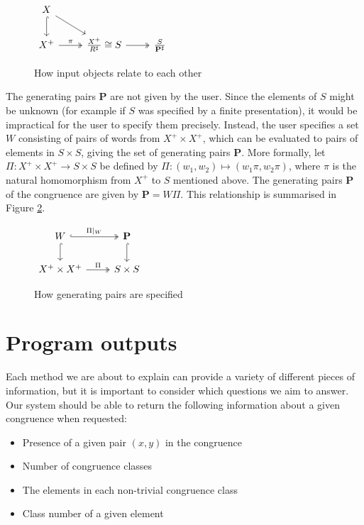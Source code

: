 \begin{figure}[ht]
  \centering
  $\begin{tikzcd}
    X \arrow[dr] \arrow[d, hook] & \\
    X^+ \arrow[r, two heads, "\pi"] & \frac{X^+}{R^\sharp} \cong S \arrow[r, two heads] & \frac{S}{\mathbf{P}^\sharp}
  \end{tikzcd}$
  \caption{How input objects relate to each other}
  \label{fig:pairs-cd-1}
\end{figure}

The generating pairs $\mathbf{P}$ are not given by the user.  Since the elements
of $S$ might be unknown (for example if $S$ was specified by a finite
presentation), it would be impractical for the user to specify them precisely.
Instead, the user specifies a set $W$ consisting of pairs of words from
$X^+ \times X^+$, which can be evaluated to pairs of elements in $S \times S$,
giving the set of generating pairs $\mathbf{P}$.
More formally, let
$\Pi: X^+ \times X^+ \to S \times S$ be defined by
$\Pi: (w_1, w_2) \mapsto (w_1\pi, w_2\pi)$, where $\pi$ is the natural
homomorphism from $X^+$ to $S$ mentioned above.  The generating pairs
$\mathbf{P}$ of the congruence are given by $\mathbf{P} = W \Pi$.
This relationship is summarised in Figure \ref{fig:pairs-cd-2}.

\begin{figure}[ht]
  \centering
  $\begin{tikzcd}
    W \arrow[r, hook, two heads, "\Pi|_W"] \arrow[d, hook] & \mathbf{P} \arrow[d, hook] \\
    X^+ \times X^+ \arrow[r, two heads, "\Pi"] & S \times S
  \end{tikzcd}$
  \caption{How generating pairs are specified}
  \label{fig:pairs-cd-2}
\end{figure}

\section{Program outputs}
\label{sec:program-outputs}

Each method we are about to explain can provide a variety of different pieces of
information, but it is important to consider which questions we aim to answer.
Our system should be able to return the following information about a given
congruence when requested:

\begin{itemize}
\item Presence of a given pair $(x,y)$ in the congruence
\item Number of congruence classes
\item The elements in each non-trivial congruence class
\item Class number of a given element
\end{itemize}

